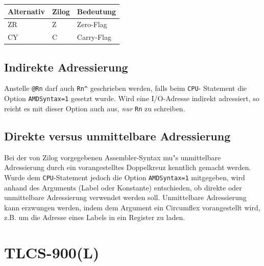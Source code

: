 \documentclass[12pt,a4paper,twoside]{report}
\newcommand{\tty}[1]{{\tt #1}}
\begin{document}
\begin{center}\begin{tabular}{|l|l|l|}
\hline
Alternativ & Zilog & Bedeutung \\
\hline
\hline
ZR         & Z     & Zero-Flag \\
CY         & C     & Carry-Flag \\
\hline
\end{tabular}\end{center}

\subsection{Indirekte Adressierung}

Anstelle \verb!@Rn! darf auch \verb!Rn^! geschrieben werden, falls beim \tty{CPU}-
Statement die Option \tty{AMDSyntax=1} gesetzt wurde.  Wird eine I/O-Adresse
indirekt adressiert, so reicht es mit dieser Option auch aus, {\em nur} \verb!Rn!
zu schreiben.

\subsection{Direkte versus unmittelbare Adressierung}

Bei der von Zilog vorgegebenen Assembler-Syntax mu"s unmittelbare Adressierung
durch ein vorangestelltes Doppelkreuz kenntlich gemacht werden.  Wurde dem
\tty{CPU}-Statement jedoch die Option \tty{AMDSyntax=1} mitgegeben, wird anhand
des Arguments (Label oder Konstante) entschieden, ob direkte oder unmittelbare
Adressierung verwendet werden soll.  Unmittelbare Adressierung kann erzwungen
werden, indem dem Argument ein Circumflex vorangestellt wird, z.B. um die
Adresse eines Labels in ein Register zu laden.


\section{TLCS-900(L)}
\label{TLCS900Spec}
\end{document}
